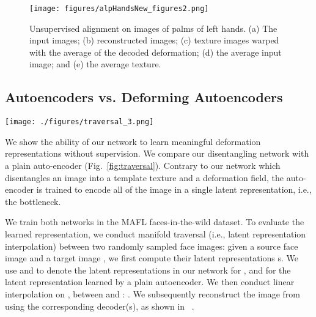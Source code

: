 \documentclass[runningheads]{llncs}
\begin{document}
\begin{figure}[ht!]
 \centering
 \texttt{[image: figures/alpHandsNew\_figures2.png]}
 \caption{Unsupervised alignment on images of palms of left hands. (a) The input images; (b) reconstructed images; (c) texture images warped with the average of the decoded deformation; (d) the average input image; and (e) the average texture.}
 \label{fig:alpHandsNew}
  \vspace{-0.5cm}
\end{figure}


\subsection{Autoencoders vs. Deforming Autoencoders}


\begin{figure*}[!h]
    \centering
    \texttt{[image: ./figures/traversal\_3.png]}
    \caption{Latent representation interpolation: we embed a face image in the latent space provided by an encoder network trained on the MAFL dataset. Our network disentangles the texture and deformation in the respective parts of the latent representation vector,  allowing a meaningful interpolation between images. Interpolating the deformation-specific part of the latent representation changes the face shape and pose (1); interpolating the latent representation for texture will generate a pose-aligned texture transfer between the images (2); traversing both latent representations will generate smooth and sharp image deformations (3,5,7). In contrast, when using a standard auto-encoder (4,6,8) such an interpolation often yields artifacts. For more results, please see Figure~\ref{fig:supp_walk1},\ref{fig:supp_walk2} in Appendix.}
    \label{fig:traversal}
\end{figure*}



We show the ability of our network to learn meaningful deformation representations without supervision. We compare our disentangling network with a plain auto-encoder (Fig.~\ref{fig:traversal}). Contrary to our network which disentangles an image into a template texture and a deformation field, the auto-encoder is trained to encode all of the image in a single latent representation, i.e., the bottleneck.  

We train both networks in the MAFL faces-in-the-wild dataset. To evaluate the learned representation, we conduct manifold traversal (i.e., latent representation interpolation) between two randomly sampled face images: given a source face image  and a target image , we first compute their latent representations s. We use  and  to denote the latent representations in our network for , and  for the latent representation learned by a plain autoencoder. We then conduct linear interpolation on , between  and : 
.
We subsequently reconstruct the image  from  using the corresponding decoder(s), as shown in ~.
\end{document}
